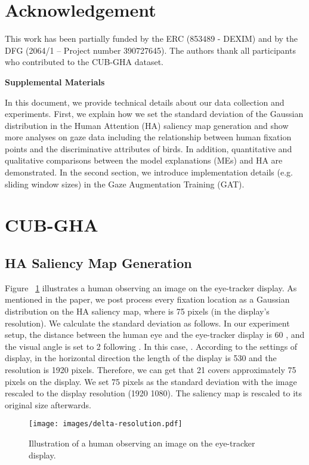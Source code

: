 \documentclass{bmvc2k}
\begin{document}
\section{Acknowledgement}
This work has been partially funded by the ERC (853489 - DEXIM) and by the DFG (2064/1 – Project number 390727645). The authors thank all participants who contributed to the CUB-GHA dataset.





\pagebreak
\begin{center}
\textbf{\large Supplemental Materials}
\end{center}
\setcounter{equation}{0}
\setcounter{figure}{0}
\setcounter{table}{0}
\setcounter{section}{0}
\makeatletter
\renewcommand{\theequation}{S\arabic{equation}}
\renewcommand{\thefigure}{S\arabic{figure}}
\renewcommand{\thetable}{S\arabic{table}}
\renewcommand{\bibnumfmt}[1]{[S#1]}
In this document, we provide technical details about our data collection and experiments. First, we explain how we set the standard deviation of the Gaussian distribution in the Human Attention (HA) saliency map generation and show more analyses on gaze data including the relationship between human fixation points and the discriminative attributes of birds. In addition, quantitative and qualitative comparisons between the model explanations (MEs) and HA are demonstrated. In the second section, we introduce implementation details (e.g. sliding window sizes) in the Gaze Augmentation Training (GAT). 

\section{CUB-GHA}
\subsection{HA Saliency Map Generation}
Figure \ \ref{fig:gaussian} illustrates a human observing an image on the eye-tracker display. As mentioned in the paper, we post process every fixation location as a Gaussian distribution  on the HA saliency map, where  is 75 pixels (in the display's resolution). We calculate the standard deviation  as follows. 
In our experiment setup, the distance  between the human eye and the eye-tracker display is 60 , and the visual angle  is set to 2 following \cite{vickers2007perception}. In this case,  . According to the settings of display, in the horizontal direction the length of the display is 530  and the resolution is 1920 pixels. Therefore, we can get that  21  covers approximately 75 pixels on the display. We set 75 pixels as the standard deviation with the image rescaled to the display resolution (1920  1080). The saliency map is rescaled to its original size afterwards.
\begin{figure}[h]
    \centering
    \texttt{[image: images/delta-resolution.pdf]} 
    \vspace{0.1cm}
    \caption{Illustration of a human observing an image on the eye-tracker display.}
    \label{fig:gaussian}
\end{figure}
\end{document}
